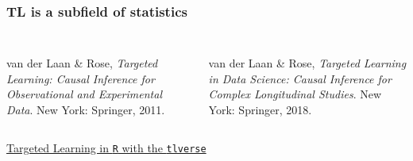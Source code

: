\documentclass[t]{beamer}
\begin{document}
\begin{frame}
\frametitle{TL is a subfield of statistics}
\vspace{-25pt}
\begin{columns}
\begin{column}{4.9cm}
\begin{center}
\begin{figure}
\end{figure}
\end{center}
\end{column}
\begin{column}{4.9cm}
\begin{figure}
\end{figure}
\end{column}
\end{columns}
\vspace{-10pt}
\begin{columns}
\begin{column}{4.9cm}
\begin{center}
{\footnotesize van der Laan \& Rose, \textit{Targeted Learning: Causal Inference for Observational and Experimental Data}. New York: Springer, 2011.}
\end{center}
\end{column}
\begin{column}{4.9cm}
\begin{center}
{\footnotesize van der Laan \& Rose, \textit{Targeted Learning in Data Science: Causal Inference for Complex Longitudinal Studies}. New York: Springer, 2018.}
\end{center}
\end{column}
\end{columns}
\vspace{15pt}
\centering
  \href{https://tlverse.org/tlverse-handbook/}{Targeted Learning in \texttt{R}
  with the \texttt{tlverse}}
\end{frame}
\end{document}
